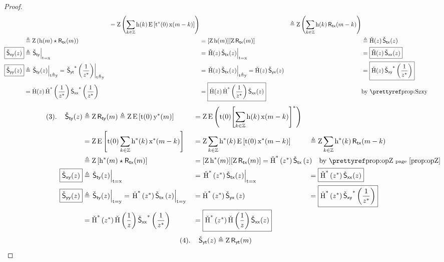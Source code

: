 \begin{proof}
\begin{align*}
     &&=    \opZ\brp{\sum_{k\in\Z} \fh(k)\pE\brs{\rvt^\ast(0)\rvx(m-k)}}
     &&\eqd \opZ\brp{\sum_{k\in\Z} \fh(k)\Rtx(m-k)}
    \\&\eqd \opZ\brp{\fh(m)\convd\Rtx(m)}
     &&=    \brs{\opZ\fh(m)}\brs{\opZ\Rtx(m)}
     &&\eqd \ZH(z) \Sztx(z)
    \\
    \boxed{\Szxy(z)}
      &\eqd \brlr{\Szty}_{\rvt=\rvx}
     &&=    \brlr{\ZH(z) \Sztx(z)}_{\rvt=\rvx}
     &&=    \boxed{\ZH(z) \Szxx(z)}
     \\
    \boxed{\Szyy(z)}
      &\eqd \brlr{\Szty(z)}_{\rvt\eqd\rvy}
       =    \brlr{\Szyt^\ast\brp{\frac{1}{z^\ast}}}_{\rvt\eqd\rvy}
     &&=    \brlr{\ZH(z) \Sztx(z)}_{\rvt\eqd\rvy}
       =    \ZH(z) \Szyx(z)
     &&=    \boxed{\ZH(z) \Szxy^\ast\brp{\frac{1}{z^\ast}}}
    \\&=    \ZH(z) \ZH^\ast\brp{\frac{1}{z^\ast}} \Szxx^\ast\brp{\frac{1}{z^\ast}}
     &&=    \boxed{\ZH(z) \ZH^\ast\brp{\frac{1}{z^\ast}} \Szxx(z)}
     &&     \text{by \pref{prop:Szxy}}
\end{align*}
\begin{align*}
    (3).\quad\Szty(z)
      &\eqd \opZ\Rty(m)
       \eqd \opZ\pE\brs{\rvt(0)\rvy^\ast(m)}
     &&=    \opZ\pE\brp{\rvt(0)\brs{\sum_{k\in\Z} \fh(k)\rvx(m-k)}^\ast}
    \\&=    \opZ\pE\brs{\rvt(0) \sum_{k\in\Z} \fh^\ast(k)      \rvx^\ast(m-k)}
     &&=    \opZ        \sum_{k\in\Z} \fh^\ast(k) \pE\brs{\rvt(0)\rvx^\ast(m-k)}
     &&\eqd \opZ        \sum_{k\in\Z} \fh^\ast(k) \Rtx(m-k)
    \\&\eqd \opZ\brs{\fh^\ast(m) \convd \Rtx(m)}
     &&=\mathrlap{\brs{\opZ\fh^\ast(m)} \brs{\opZ\Rtx(m)}
       = \ZH^\ast\brp{z^\ast} \Sztx\brp{z} \quad\text{by \prefp{prop:opZ}}}
    \\
    \boxed{\Szxy(z)}
      &\eqd \brlr{\Szty(z)}_{\rvt=\rvx}
     &&= \brlr{\ZH^\ast\brp{z^\ast} \Sztx(z)}_{\rvt=\rvx}
     &&= \boxed{\ZH^\ast\brp{z^\ast} \Szxx(z)}
    \\
    \boxed{\Szyy(z)}
      &\eqd \brlr{\Szty(z)}_{\rvt=\rvy}
       = \brlr{\ZH^\ast\brp{z^\ast} \Sztx\brp{z}}_{\rvt=\rvy}
     &&= \ZH^\ast\brp{z^\ast} \Szyx\brp{z}
     &&= \boxed{\ZH^\ast\brp{z^\ast} \Szxy^\ast\brp{\frac{1}{z^\ast}}}
    \\&= \ZH^\ast\brp{z^\ast} \ZH\brp{\frac{1}{z}} \Szxx^\ast\brp{\frac{1}{z^\ast}}
     &&= \boxed{\ZH^\ast\brp{z^\ast} \ZH\brp{\frac{1}{z}} \Szxx(z)}
\end{align*}
\begin{align*}
    (4).\quad\Szyt(z)
      &\eqd \opZ\Ryt(m)

\end{align*}
\end{proof}
